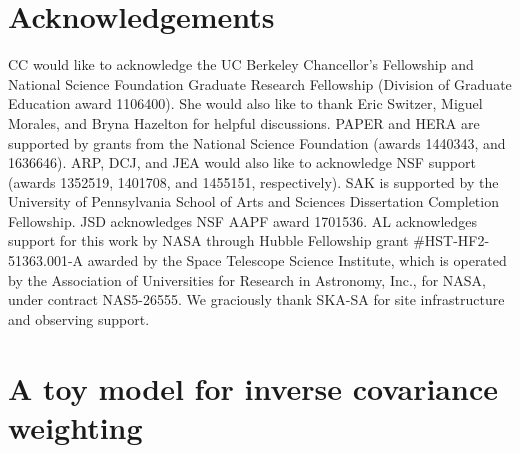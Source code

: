 \documentclass[preprint2,numberedappendix,tighten]{aastex6}
\begin{document}
\section{Acknowledgements}
CC would like to acknowledge the UC Berkeley Chancellor's Fellowship and National Science Foundation Graduate Research 
Fellowship (Division of Graduate Education award 1106400). She would also like to thank Eric Switzer, Miguel Morales, and Bryna Hazelton for helpful discussions. PAPER and HERA 
are supported by grants from the National Science Foundation (awards 1440343, and 1636646). ARP, DCJ, and JEA would 
also like to acknowledge NSF support (awards 1352519, 1401708, and 1455151, respectively). SAK is supported by the University of Pennsylvania School of Arts and Sciences Dissertation Completion Fellowship. JSD acknowledges NSF AAPF
award 1701536. AL acknowledges support for this work by NASA through Hubble Fellowship grant \#HST-HF2-51363.001-A awarded by the Space Telescope Science Institute, which is operated by the Association of Universities for Research in Astronomy, Inc., for NASA, under contract NAS5-26555. We graciously thank SKA-SA for site infrastructure and observing support.
\label{sec:Ack}


\color{blue}

\appendix
\section{A toy model for inverse covariance weighting}
\label{sec:icw_appendix}
\end{document}
